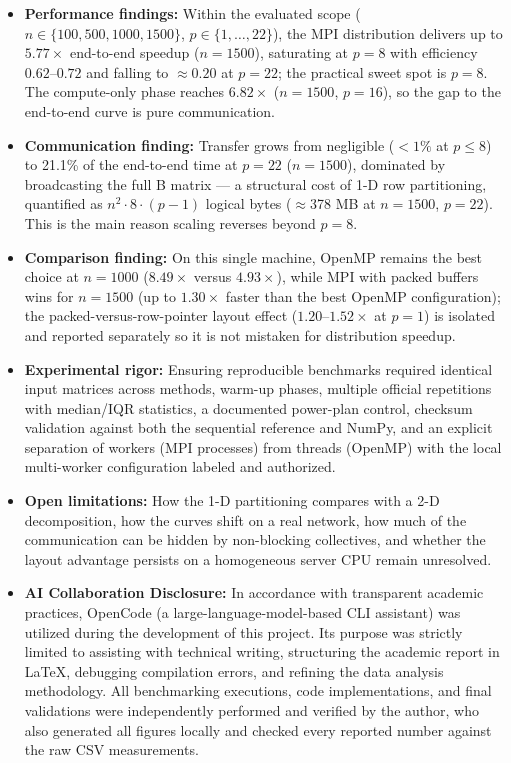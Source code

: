 \documentclass[12pt,a4paper]{article}
\begin{document}
\begin{itemize}
\item \textbf{Performance findings:} Within the evaluated scope
($n \in \{100, 500, 1000, 1500\}$, $p \in \{1, \dots, 22\}$), the MPI
distribution delivers up to $5.77\times$ end-to-end speedup ($n = 1500$),
saturating at $p = 8$ with efficiency $0.62$--$0.72$ and falling to
$\approx 0.20$ at $p = 22$; the practical sweet spot is $p = 8$. The
compute-only phase reaches $6.82\times$ ($n = 1500$, $p = 16$), so the gap
to the end-to-end curve is pure communication.
\item \textbf{Communication finding:} Transfer grows from negligible
($<1\%$ at $p \leq 8$) to 21.1\% of the end-to-end time at $p = 22$
($n = 1500$), dominated by broadcasting the full B matrix --- a structural
cost of 1-D row partitioning, quantified as
$n^2 \cdot 8 \cdot (p-1)$ logical bytes ($\approx$378 MB at $n = 1500$,
$p = 22$). This is the main reason scaling reverses beyond $p = 8$.
\item \textbf{Comparison finding:} On this single machine, OpenMP remains
the best choice at $n = 1000$ ($8.49\times$ versus $4.93\times$), while MPI
with packed buffers wins for $n = 1500$ (up to $1.30\times$ faster than the
best OpenMP configuration); the packed-versus-row-pointer layout effect
($1.20$--$1.52\times$ at $p = 1$) is isolated and reported separately so it
is not mistaken for distribution speedup.
\item \textbf{Experimental rigor:} Ensuring reproducible benchmarks
required identical input matrices across methods, warm-up phases, multiple
official repetitions with median/IQR statistics, a documented power-plan
control, checksum validation against both the sequential reference and
NumPy, and an explicit separation of workers (MPI processes) from threads
(OpenMP) with the local multi-worker configuration labeled and authorized.
\item \textbf{Open limitations:} How the 1-D partitioning compares with a
2-D decomposition, how the curves shift on a real network, how much of the
communication can be hidden by non-blocking collectives, and whether the
layout advantage persists on a homogeneous server CPU remain unresolved.
\item \textbf{AI Collaboration Disclosure:} In accordance with transparent
academic practices, OpenCode (a large-language-model-based CLI assistant)
was utilized during the development of this project. Its purpose was
strictly limited to assisting with technical writing, structuring the
academic report in LaTeX, debugging compilation errors, and refining the
data analysis methodology. All benchmarking executions, code
implementations, and final validations were independently performed and
verified by the author, who also generated all figures locally and checked
every reported number against the raw CSV measurements.
\end{itemize}
\end{document}
